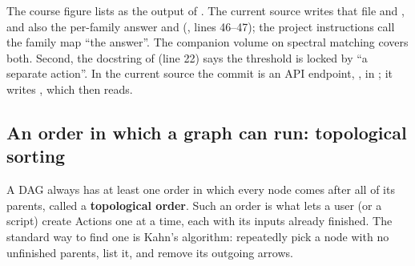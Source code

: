 
\begin{sourcenote}
The course figure lists  as the output of .
The current source writes that file and , and also the per-family answer
 and 
(, lines 46--47); the
project instructions call the family map ``the answer''. The companion volume on spectral matching
covers both. Second, the docstring of  (line 22) says the
threshold is locked by ``a separate  action''. In the current
source the commit is an API endpoint, , in
; it writes , which
 then reads.
\end{sourcenote}

\subsection{An order in which a graph can run: topological sorting}

A DAG always has at least one order in which every node comes after all of its parents, called a
\textbf{topological order}. Such an order is what lets a user (or a
script) create Actions one at a time, each with its inputs already finished. The standard way to
find one is Kahn's algorithm: repeatedly pick a node with no unfinished parents, list it, and
remove its outgoing arrows.

